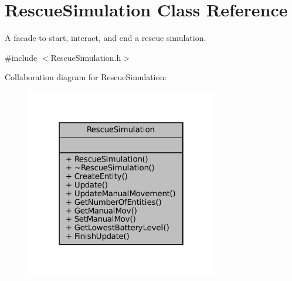 \hypertarget{classRescueSimulation}{}\section{Rescue\+Simulation Class Reference}
\label{classRescueSimulation}


A facade to start, interact, and end a rescue simulation.  




{\ttfamily \#include $<$Rescue\+Simulation.\+h$>$}



Collaboration diagram for Rescue\+Simulation\+:\nopagebreak
\begin{figure}[H]
\begin{center}
\leavevmode
\includegraphics[width=238pt]{classRescueSimulation__coll__graph}
\end{center}
\end{figure}
